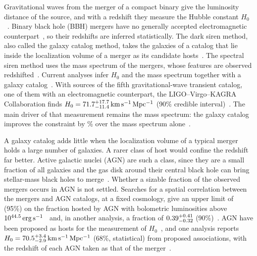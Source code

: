 \documentclass[aps,prd,reprint,amsmath,amssymb,nofootinbib]{revtex4-2}
\newcommand{\kmsMpc}{\,{\rm km\,s^{-1}\,Mpc^{-1}}}
\begin{document}
Gravitational waves from the merger of a compact binary give the luminosity distance of the source, and with a redshift they measure the Hubble constant $H_0$~\cite{Schutz:1986gp,Holz:2005df}.
Binary black hole (BBH) mergers have no generally accepted electromagnetic counterpart~\cite{Graham:2020gwr,Graham:2022xxu,Palmese:2021wcv,Veronesi:2024pjq,Cabrera:2025tzc}, so their redshifts are inferred statistically.
The dark siren method, also called the galaxy catalog method, takes the galaxies of a catalog that lie inside the localization volume of a merger as its candidate hosts~\cite{Schutz:1986gp,DelPozzo:2011vcw,LIGOScientific:2018gmd,DES:2019ccw,Gray:2019ksv,DES:2020nay,Finke:2021aom,Palmese:2021mjm}.
The spectral siren method uses the mass spectrum of the mergers, whose features are observed redshifted~\cite{Taylor:2011fs,Farr:2019twy,Mastrogiovanni:2021wsd,Ezquiaga:2022zkx}.
Current analyses infer $H_0$ and the mass spectrum together with a galaxy catalog~\cite{Mastrogiovanni:2023emh,Gray:2023wgj,Borghi:2023opd}.
With \IndLitFifthNsrc{} sources of the fifth gravitational-wave transient catalog, one of them with an electromagnetic counterpart, the LIGO--Virgo--KAGRA Collaboration finds $H_0=\IndLitFifthHzero\kmsMpc$ (90\% credible interval)~\cite{LIGOScientific:2026uyd}.
The main driver of that measurement remains the mass spectrum: the galaxy catalog improves the constraint by \IndLitFifthCatGain\% over the mass spectrum alone~\cite{LIGOScientific:2026uyd}.

A galaxy catalog adds little when the localization volume of a typical merger holds a large number of galaxies.
A rarer class of host would confine the redshift far better.
Active galactic nuclei (AGN) are such a class, since they are a small fraction of all galaxies and the gas disk around their central black hole can bring stellar-mass black holes to merge~\cite{Bartos:2016dgn,Stone:2016wzz,Mckernan:2017ssq,Tagawa:2019osr}.
Whether a sizable fraction of the observed mergers occurs in AGN is not settled.
Searches for a spatial correlation between the mergers and AGN catalogs, at a fixed cosmology, give an upper limit of \IndLitQuaiafAGNUL{} (95\%) on the fraction hosted by AGN with bolometric luminosities above $10^{44.5}\,{\rm erg\,s^{-1}}$~\cite{Veronesi:2024tef} and, in another analysis, a fraction of $0.39^{+0.41}_{-0.32}$ (90\%)~\cite{Zhu:2025rdv}.
AGN have been proposed as hosts for the measurement of $H_0$~\cite{Alves:2020wnl,Bom:2023zgw,Li:2025eig}, and one analysis reports $H_0=\IndLitKumarHzero\kmsMpc$ (68\%, statistical) from \IndLitKumarN{} proposed associations, with the redshift of each AGN taken as that of the merger~\cite{Kumar:2026bqt}.
\end{document}
